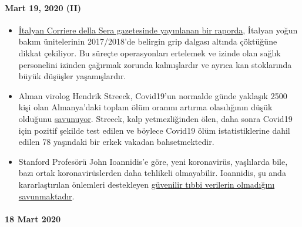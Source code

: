 \hypertarget{mart-19-2020-ii}{%
\paragraph{Mart 19, 2020 (II)}\label{mart-19-2020-ii}}

\begin{itemize}
\tightlist
\item
  \href{https://milano.corriere.it/notizie/cronaca/18_gennaio_10/milano-terapie-intensive-collasso-l-influenza-gia-48-malati-gravi-molte-operazioni-rinviate-c9dc43a6-f5d1-11e7-9b06-fe054c3be5b2.shtml}{İtalyan
  Corriere della Sera gazetesinde yayınlanan bir raporda}, İtalyan yoğun
  bakım ünitelerinin 2017/2018'de belirgin grip dalgası altında
  çöktüğüne dikkat çekiliyor. Bu süreçte operasyonları ertelemek ve
  izinde olan sağlık personelini izinden çağırmak zorunda kalmışlardır
  ve ayrıca kan stoklarında büyük düşüşler yaşamışlardır.
\item
  Alman virolog Hendrik Streeck, Covid19'un normalde günde yaklaşık 2500
  kişi olan Almanya'daki toplam ölüm oranını artırma olasılığının düşük
  olduğunu
  \href{https://www.faz.net/aktuell/gesellschaft/gesundheit/coronavirus/virologe-hendrik-streeck-ueber-corona-neue-symptome-entdeckt-16681450.html?printPagedArticle=true\#pageIndex_2}{savunuyor}.
  Streeck, kalp yetmezliğinden ölen, daha sonra Covid19 için pozitif
  şekilde test edilen ve böylece Covid19 ölüm istatistiklerine dahil
  edilen 78 yaşındaki bir erkek vakadan bahsetmektedir.
\item
  Stanford Profesörü John Ioannidis'e göre, yeni koronavirüs, yaşlılarda
  bile, bazı ortak koronavirüslerden daha tehlikeli olmayabilir.
  Ioannidis, şu anda kararlaştırılan önlemleri destekleyen
  \href{https://www.statnews.com/2020/03/17/a-fiasco-in-the-making-as-the-coronavirus-pandemic-takes-hold-we-are-making-decisions-without-reliable-data/}{güvenilir
  tıbbi verilerin olmadığını savunmaktadır}.
\end{itemize}

\hypertarget{18-mart-2020}{%
\paragraph{18 Mart 2020}\label{18-mart-2020}}

